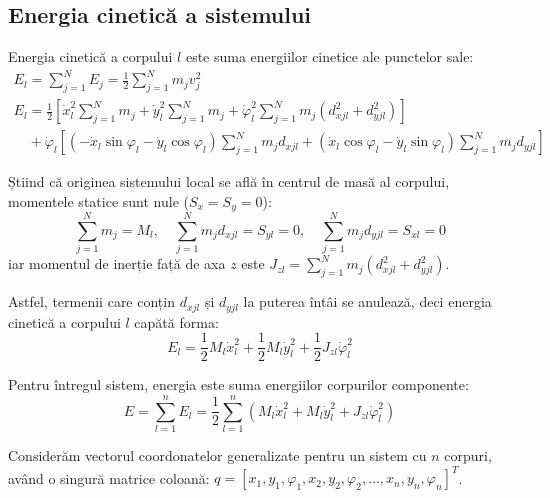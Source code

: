 \documentclass[12pt, a4paper]{article}
\begin{document}
\subsection{Energia cinetică a sistemului}

Energia cinetică a corpului $l$ este suma energiilor cinetice ale punctelor sale:
\begin{equation}
    \begin{gathered}
        E_l = \sum_{j=1}^{N} E_j = \frac{1}{2}\sum_{j=1}^{N} m_j v_j^2 \\
             E_l = \frac{1}{2} \left[ \dot{x}_l^2\sum_{j=1}^{N} m_j + \dot{y}_l^2\sum_{j=1}^{N} m_j + \dot{\varphi}_l^2\sum_{j=1}^{N} m_j(d_{xjl}^2 + d_{yjl}^2) \right] \\
             \quad + \dot{\varphi}_l \left[ (-\dot{x}_l\sin\varphi_l - \dot{y}_l\cos\varphi_l) \sum_{j=1}^{N} m_j d_{xjl} + (\dot{x}_l\cos\varphi_l - \dot{y}_l\sin\varphi_l) \sum_{j=1}^{N} m_j d_{yjl} \right]
    \end{gathered}
\end{equation}

Știind că originea sistemului local se află în centrul de masă al corpului, momentele statice sunt nule ($S_x = S_y = 0$):
\begin{equation}
    \sum_{j=1}^{N} m_j = M_l, \quad \sum_{j=1}^{N} m_j d_{xjl} = S_{yl} = 0, \quad \sum_{j=1}^{N} m_j d_{yjl} = S_{xl} = 0
\end{equation}
iar momentul de inerție față de axa $z$ este $J_{zl} = \sum_{j=1}^{N} m_j(d_{xjl}^2 + d_{yjl}^2)$.

Astfel, termenii care conțin $d_{xjl}$ și $d_{yjl}$ la puterea întâi se anulează, deci energia cinetică a corpului $l$ capătă forma:
\begin{equation}
    E_l = \frac{1}{2} M_l \dot{x}_l^2 + \frac{1}{2} M_l \dot{y}_l^2 + \frac{1}{2} J_{zl} \dot{\varphi}_l^2
\end{equation}

Pentru întregul sistem, energia este suma energiilor corpurilor componente:
\begin{equation}
    E = \sum_{l=1}^{n} E_l = \frac{1}{2}\sum_{l=1}^{n} (M_l\dot{x}_l^2 + M_l\dot{y}_l^2 + J_{zl}\dot{\varphi}_l^2)
\end{equation}

Considerăm vectorul coordonatelor generalizate pentru un sistem cu $n$ corpuri, având o singură matrice coloană:
$q = [x_1, y_1, \varphi_1, x_2, y_2, \varphi_2, \dots, x_n, y_n, \varphi_n]^T$. 
\end{document}
